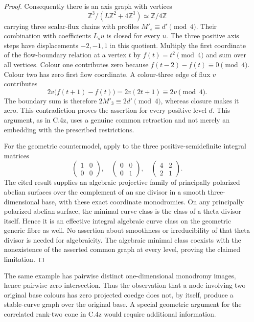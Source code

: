 \begin{proof}
Consequently there is an axis graph with vertices
\[
 \mathbb Z^3/(L\mathbb Z^2+4\mathbb Z^3)
                  \simeq\mathbb Z/4\mathbb Z
\]
carrying three scalar-flux chains with profiles
$M'_s\equiv d'\pmod4$. Their combination with coefficients
$L_su$ is closed for every $u$. The three positive axis steps
have displacements $-2,-1,1$ in this quotient.
Multiply the first coordinate of the flow-boundary relation
at a vertex $t$ by $f(t)=t^2\pmod4$ and sum over all vertices.
Colour one contributes zero because
$f(t-2)-f(t)\equiv0\pmod4$. Colour two has zero first flow
coordinate. A colour-three edge of flux $v$ contributes
\[
 2v\bigl(f(t+1)-f(t)\bigr)
       =2v(2t+1)\equiv2v\pmod4.
\]
The boundary sum is therefore $2M'_3\equiv2d'\pmod4$,
whereas closure makes it zero. This contradiction proves
the assertion for every positive level $d$. This argument,
as in C.4z, uses a genuine common retraction and not merely
an embedding with the prescribed restrictions.

For the geometric countermodel, apply
\citet[Proposition~2.29 and Corollary~2.30]{frEGFSMumfordSurvey2026}
to the three positive-semidefinite integral matrices
\[
 \begin{pmatrix}1&0\\0&0\end{pmatrix},\quad
 \begin{pmatrix}0&0\\0&1\end{pmatrix},\quad
 \begin{pmatrix}4&2\\2&1\end{pmatrix}.
\]
The cited result supplies an algebraic projective family of
principally polarized abelian surfaces over the complement
of an snc divisor in a smooth three-dimensional base, with
these exact coordinate monodromies. On any principally
polarized abelian surface, the minimal curve class is the
class of a theta divisor itself. Hence it is an effective
integral algebraic curve class on the geometric generic
fibre as well. No assertion about smoothness or irreducibility
of that theta divisor is needed for algebraicity. The
algebraic minimal class coexists with the nonexistence of
the asserted common graph at every level, proving the
claimed limitation.
\end{proof}

The same example has pairwise distinct one-dimensional monodromy
images, hence pairwise zero intersection. Thus the observation that
a node involving two original base colours has zero projected
coedge does not, by itself, produce a stable-curve graph over the
original base. A special geometric argument for the correlated
rank-two cone in C.4z would require additional information.
